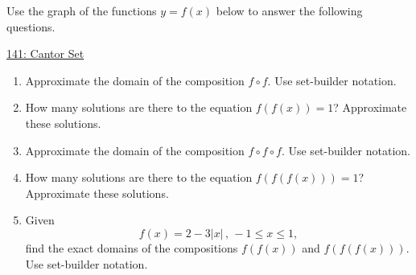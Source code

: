\documentclass{ximera}
\begin{document}
\begin{example} \label{EXmdfm3090}

Use the graph of the functions $y=f(x)$  below to answer the following questions.

\begin{onlineOnly}
    \begin{center}
\end{center}
\end{onlineOnly}

\href{https://www.desmos.com/calculator/c02me6b3fy}{141: Cantor Set}


\begin{enumerate}
\item Approximate the domain of the composition $f\circ f$. Use set-builder notation.

\item How many solutions are there to the equation $f(f(x))=1$? Approximate these solutions.

\item Approximate the domain of the composition $f\circ f\circ f$. Use set-builder notation.

\item How many solutions are there to the equation $f(f(f(x)))=1$? Approximate these solutions.

\item Given 
\[
 f(x) = 2 - 3|x| \, , \, -1\leq x \leq 1 ,
\]
find the exact domains of the compositions $f(f(x))$ and $f(f(f(x)))$. Use set-builder notation.

\end{enumerate}
\end{example}
\end{document}
